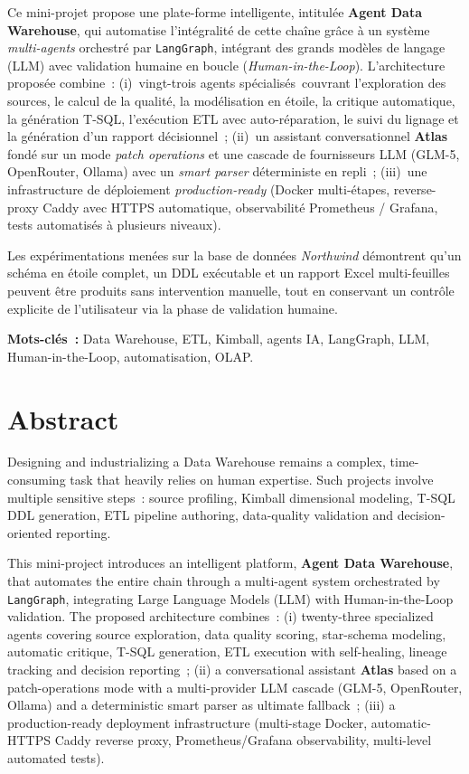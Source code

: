 \documentclass[12pt, a4paper]{report}
\begin{document}
Ce mini-projet propose une plate-forme intelligente, intitulée
\textbf{Agent Data Warehouse}, qui automatise l'intégralité de cette chaîne
grâce à un système \emph{multi-agents} orchestré par \texttt{LangGraph}, intégrant
des grands modèles de langage (LLM) avec validation humaine en boucle
(\emph{Human-in-the-Loop}). L'architecture proposée combine~:
(i)~vingt-trois agents spécialisés~couvrant l'exploration des sources,
le calcul de la qualité, la modélisation en étoile, la critique automatique,
la génération T-SQL, l'exécution ETL avec auto-réparation, le suivi du lignage
et la génération d'un rapport décisionnel~;
(ii)~un assistant conversationnel \textbf{Atlas} fondé sur un mode \emph{patch
operations} et une cascade de fournisseurs LLM (GLM-5, OpenRouter, Ollama)
avec un \emph{smart parser} déterministe en repli~;
(iii)~une infrastructure de déploiement \emph{production-ready} (Docker
multi-étapes, reverse-proxy Caddy avec HTTPS automatique, observabilité
Prometheus / Grafana, tests automatisés à plusieurs niveaux).

Les expérimentations menées sur la base de données \textit{Northwind} démontrent
qu'un schéma en étoile complet, un DDL exécutable et un rapport Excel multi-feuilles
peuvent être produits sans intervention manuelle, tout en conservant un contrôle
explicite de l'utilisateur via la phase de validation humaine.

\textbf{Mots-clés~:} Data Warehouse, ETL, Kimball, agents IA, LangGraph,
LLM, Human-in-the-Loop, automatisation, OLAP.

\cleardoublepage

\chapter*{Abstract}
\thispagestyle{empty}

Designing and industrializing a Data Warehouse remains a complex,
time-consuming task that heavily relies on human expertise. Such projects
involve multiple sensitive steps~: source profiling, Kimball dimensional
modeling, T-SQL DDL generation, ETL pipeline authoring, data-quality
validation and decision-oriented reporting.

This mini-project introduces an intelligent platform, \textbf{Agent Data
Warehouse}, that automates the entire chain through a multi-agent system
orchestrated by \texttt{LangGraph}, integrating Large Language Models (LLM)
with Human-in-the-Loop validation. The proposed architecture combines~:
(i) twenty-three specialized agents covering source exploration, data quality
scoring, star-schema modeling, automatic critique, T-SQL generation, ETL
execution with self-healing, lineage tracking and decision reporting~;
(ii) a conversational assistant \textbf{Atlas} based on a patch-operations mode
with a multi-provider LLM cascade (GLM-5, OpenRouter, Ollama) and a
deterministic smart parser as ultimate fallback~; (iii) a production-ready
deployment infrastructure (multi-stage Docker, automatic-HTTPS Caddy reverse
proxy, Prometheus/Grafana observability, multi-level automated tests).
\end{document}
